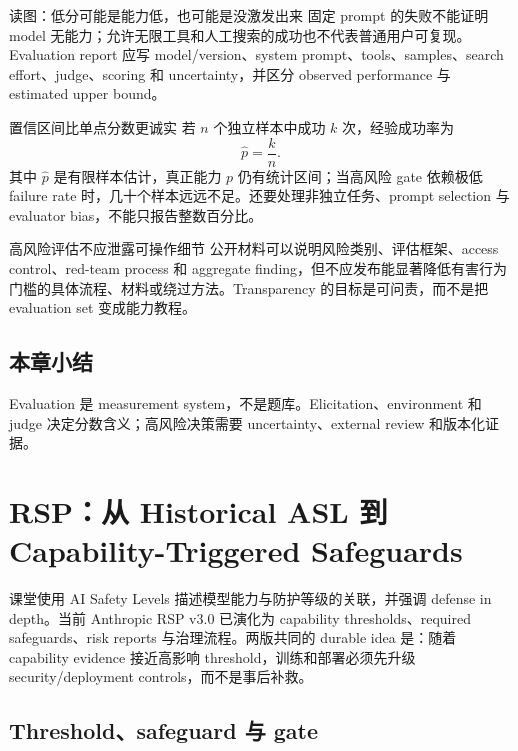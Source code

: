\documentclass[a4paper]{article}
\begin{document}
\begin{knowledgebox}{读图：低分可能是能力低，也可能是没激发出来}
固定 prompt 的失败不能证明 model 无能力；允许无限工具和人工搜索的成功也不代表普通用户可复现。Evaluation report 应写 model/version、system prompt、tools、samples、search effort、judge、scoring 和 uncertainty，并区分 observed performance 与 estimated upper bound。
\end{knowledgebox}

\begin{importantbox}{置信区间比单点分数更诚实}
若 $n$ 个独立样本中成功 $k$ 次，经验成功率为
\[
\hat p=\frac{k}{n}.
\]
其中 $\hat p$ 是有限样本估计，真正能力 $p$ 仍有统计区间；当高风险 gate 依赖极低 failure rate 时，几十个样本远远不足。还要处理非独立任务、prompt selection 与 evaluator bias，不能只报告整数百分比。
\end{importantbox}

\begin{warningbox}{高风险评估不应泄露可操作细节}
公开材料可以说明风险类别、评估框架、access control、red-team process 和 aggregate finding，但不应发布能显著降低有害行为门槛的具体流程、材料或绕过方法。Transparency 的目标是可问责，而不是把 evaluation set 变成能力教程。
\end{warningbox}

\subsection{本章小结}

Evaluation 是 measurement system，不是题库。Elicitation、environment 和 judge 决定分数含义；高风险决策需要 uncertainty、external review 和版本化证据。

\section{RSP：从 Historical ASL 到 Capability-Triggered Safeguards}

课堂使用 AI Safety Levels 描述模型能力与防护等级的关联，并强调 defense in depth。当前 Anthropic RSP v3.0 已演化为 capability thresholds、required safeguards、risk reports 与治理流程。两版共同的 durable idea 是：随着 capability evidence 接近高影响 threshold，训练和部署必须先升级 security/deployment controls，而不是事后补救。

\subsection{Threshold、safeguard 与 gate}
\end{document}
